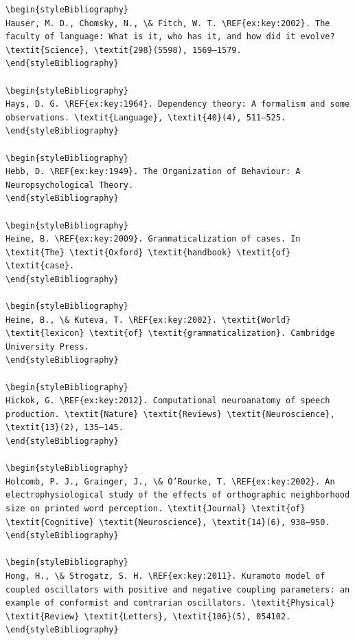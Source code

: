 \begin{verbatim}
\begin{styleBibliography}
Hauser, M. D., Chomsky, N., \& Fitch, W. T. \REF{ex:key:2002}. The faculty of language: What is it, who has it, and how did it evolve? \textit{Science}, \textit{298}(5598), 1569–1579.
\end{styleBibliography}

\begin{styleBibliography}
Hays, D. G. \REF{ex:key:1964}. Dependency theory: A formalism and some observations. \textit{Language}, \textit{40}(4), 511–525.
\end{styleBibliography}

\begin{styleBibliography}
Hebb, D. \REF{ex:key:1949}. The Organization of Behaviour: A Neuropsychological Theory.
\end{styleBibliography}

\begin{styleBibliography}
Heine, B. \REF{ex:key:2009}. Grammaticalization of cases. In \textit{The} \textit{Oxford} \textit{handbook} \textit{of} \textit{case}.
\end{styleBibliography}

\begin{styleBibliography}
Heine, B., \& Kuteva, T. \REF{ex:key:2002}. \textit{World} \textit{lexicon} \textit{of} \textit{grammaticalization}. Cambridge University Press.
\end{styleBibliography}

\begin{styleBibliography}
Hickok, G. \REF{ex:key:2012}. Computational neuroanatomy of speech production. \textit{Nature} \textit{Reviews} \textit{Neuroscience}, \textit{13}(2), 135–145.
\end{styleBibliography}

\begin{styleBibliography}
Holcomb, P. J., Grainger, J., \& O’Rourke, T. \REF{ex:key:2002}. An electrophysiological study of the effects of orthographic neighborhood size on printed word perception. \textit{Journal} \textit{of} \textit{Cognitive} \textit{Neuroscience}, \textit{14}(6), 938–950.
\end{styleBibliography}

\begin{styleBibliography}
Hong, H., \& Strogatz, S. H. \REF{ex:key:2011}. Kuramoto model of coupled oscillators with positive and negative coupling parameters: an example of conformist and contrarian oscillators. \textit{Physical} \textit{Review} \textit{Letters}, \textit{106}(5), 054102.
\end{styleBibliography}


\end{verbatim}
